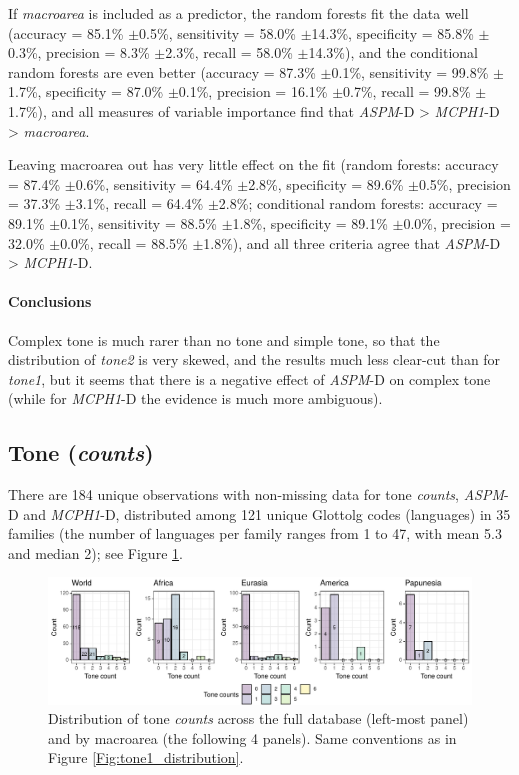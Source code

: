 \documentclass[twoside,onecolumn]{article}
\begin{document}
If \textit{macroarea} is included as a predictor, the random forests fit the data well (accuracy = 85.1\% $\pm$0.5\%, sensitivity = 58.0\% $\pm$14.3\%, specificity = 85.8\% $\pm$0.3\%, precision = 8.3\% $\pm$2.3\%, recall = 58.0\% $\pm$14.3\%), and the conditional random forests are even better (accuracy = 87.3\% $\pm$0.1\%, sensitivity = 99.8\% $\pm$1.7\%, specificity = 87.0\% $\pm$0.1\%, precision = 16.1\% $\pm$0.7\%, recall = 99.8\% $\pm$1.7\%), and all measures of variable importance find that \textit{ASPM}-D > \textit{MCPH1}-D > \textit{macroarea}.

Leaving macroarea out has very little effect on the fit (random forests: accuracy = 87.4\% $\pm$0.6\%, sensitivity = 64.4\% $\pm$2.8\%, specificity = 89.6\% $\pm$0.5\%, precision = 37.3\% $\pm$3.1\%, recall = 64.4\% $\pm$2.8\%; conditional random forests: accuracy = 89.1\% $\pm$0.1\%, sensitivity = 88.5\% $\pm$1.8\%, specificity = 89.1\% $\pm$0.0\%, precision = 32.0\% $\pm$0.0\%, recall = 88.5\% $\pm$1.8\%), and all three criteria agree that \textit{ASPM}-D > \textit{MCPH1}-D.


\paragraph{Conclusions}

Complex tone is much rarer than no tone and simple tone, so that the distribution of \textit{tone2} is very skewed, and the results much less clear-cut than for \textit{tone1}, but it seems that there is a negative effect of \textit{ASPM}-D on complex tone (while for \textit{MCPH1}-D the evidence is much more ambiguous).




\subsection{Tone (\textit{counts})}

There are 184 unique observations with non-missing data for tone \textit{counts}, \textit{ASPM}-D and \textit{MCPH1}-D, distributed among 121 unique Glottolg codes (languages) in 35 families (the number of languages per family ranges from 1 to 47, with mean 5.3 and median 2); see Figure \ref{Fig:tone_counts_distribution}.

\begin{figure}[h]
  \centering
  \includegraphics[width=\textwidth]{../../code/figures/tone_counts_distribution}
  \caption{Distribution of tone \textit{counts} across the full database (left-most panel) and by macroarea (the following 4 panels). Same conventions as in Figure \ref{Fig:tone1_distribution}.}
  \label{Fig:tone_counts_distribution}
\end{figure}
\end{document}
